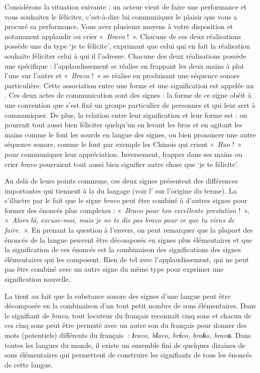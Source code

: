 Considérons la situation suivante : un acteur vient de faire une performance et vous souhaitez le féliciter, c’est-à-dire lui communiquer le plaisir que vous a procuré sa performance. Vous avez plusieurs moyens à votre disposition et notamment applaudir ou crier «~\textit{Bravo} !~». Chacune de ces deux réalisations possède une  du type ‘je te félicite’, exprimant que celui qui en fait la réalisation souhaite féliciter celui à qui il l’adresse. Chacune des deux réalisations possède une  spécifique : l’applaudis\-sement se réalise en frappant les deux mains à plat l’une sur l’autre et «~\textit{Bravo} !~» se réalise en produisant une séquence sonore particulière. Cette association entre une forme et une signification est appelée un . Ces deux actes de communication sont des signes  : la forme de ce signe obéit à une convention que s’est fixé un groupe particulier de personnes et qui leur sert à communiquer. De plus, la relation entre leur signification et leur forme est  : on pourrait tout aussi bien féliciter quelqu’un en levant les bras et en agitant les mains comme le font les sourds en langue des signes, ou bien prononcer une autre séquence sonore, comme le font par exemple les Chinois qui crient «~\textit{Hao} !~» pour communiquer leur appréciation. Inversement, frapper dans ses mains ou crier \textit{bravo} pourraient tout aussi bien signifier autre chose que ‘je te félicite’.

Au delà de leurs points communs, ces deux signes présentent des différences importantes qui tiennent à la  du langage (voir l' sur l’origine du terme). La  s’illustre par le fait que le signe \textit{bravo} peut être combiné à d’autres signes pour former des énoncés plus complexes : «~\textit{Bravo pour ton excellente prestation} !~», «~\textit{Alors là, excuse-moi, mais je ne te dis pas bravo pour ce que tu viens de faire.}~». En prenant la question à l’envers, on peut remarquer que la plupart des énoncés de la langue peuvent être décomposés en signes plus élémentaires et que la signification de ces énoncés est la combinaison des significations des signes élémentaires qui les composent. Rien de tel avec l’applaudissement, qui ne peut pas être combiné avec un autre signe du même type pour exprimer une signification nouvelle.

La  tient au fait que la substance sonore des signes d’une langue peut être décomposée en la combinaison d’un tout petit nombre de sons élémentaires. Dans le signifiant de \textit{bravo}, tout locuteur du français reconnaît cinq sons et chacun de ces cinq sons peut être permuté avec un autre son du français pour donner des mots (potentiels) différents du français~\textit{:} \textbf{\textit{t}}\textit{ravo, b}\textbf{\textit{l}}\textit{avo, br}\textbf{\textit{i}}\textit{vo, bra}\textbf{\textit{k}}\textit{o, brav}\textbf{\textit{a}}. Dans toutes les langues du monde, il existe un ensemble fini de quelques dizaines de sons élémentaires qui permettent de construire les signifiants de tous les énoncés de cette langue.


